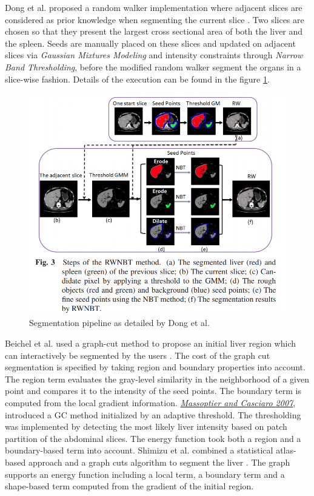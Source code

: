 \documentclass[]{article}
\begin{document}
	Dong et al. proposed a random walker implementation where adjacent slices are
	considered as prior knowledge when segmenting the current slice \cite{Dong2016}. Two
	slices are chosen so that they present the largest cross sectional area
	of both the liver and the spleen. Seeds are manually placed on these
	slices and updated on adjacent slices via \emph{Gaussian Mixtures
		Modeling} and intensity constraints through \emph{Narrow Band
		Thresholding}, before the modified random walker segment the organs in a
	slice-wise fashion. Details of the execution can be found in the figure
	\ref{Dong2016_Fig3}.
	
	\begin{figure}[th!]
		\centering
		\includegraphics[width=0.7\linewidth]{images/image14}
		\caption{Segmentation pipeline as detailed by Dong et al. \cite{Dong2016}}
		\label{Dong2016_Fig3}
	\end{figure}
	
	
	Beichel et al. used a graph-cut method to propose an initial liver
	region which can interactively be segmented by the users \cite{Beichel2004}. The cost of
	the graph cut segmentation is specified by taking region and boundary
	properties into account. The region term evaluates the gray-level
	similarity in the neighborhood of a given point and compares it to the
	intensity of the seed points. The boundary term is computed from the
	local gradient information.
	\href{https://www.researchgate.net/publication/5844188_Fully_Automatic_Liver_Segmentation_through_Graph-Cut_Technique}{\emph{Massoptier
			and Casciaro 2007}}, introduced a GC method initialized by an adaptive
	threshold. The thresholding was implemented by detecting the most likely
	liver intensity based on patch partition of the abdominal slices. The
	energy function took both a region and a boundary-based term into
	account.
	Shimizu et al. combined a statistical atlas-based approach and a graph
	cuts algorithm to segment the liver \cite{Shimizu2011}. The graph supports an energy
	function including a local term, a boundary term and a shape-based term
	computed from the gradient of the initial region.
	
\end{document}
